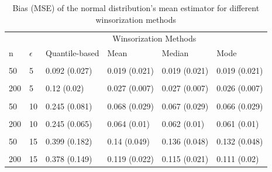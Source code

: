 \documentclass[notitlepage,12pt]{jedm}
\begin{document}
\begin{table}[H]

\caption{\label{tab:unnamed-chunk-4}Bias (MSE) of the normal distribution's mean estimator for different winsorization methods}
\centering
\begin{tabular}[t]{l|l|l|l|l|l}
\hline
\multicolumn{2}{c|}{ } & \multicolumn{4}{c}{Winsorization Methods} \\
\cline{3-6}
n & $\epsilon$ & Quantile-based & Mean & Median & Mode\\
\hline
\cellcolor{gray!6}{20} & \cellcolor{gray!6}{5} & \cellcolor{gray!6}{0.111 (0.06)} & \cellcolor{gray!6}{0.021 (0.058)} & \cellcolor{gray!6}{0.02 (0.058)} & \cellcolor{gray!6}{0.02 (0.058)}\\
\hline
50 & 5 & 0.092 (0.027) & 0.019 (0.021) & 0.019 (0.021) & 0.019 (0.021)\\
\hline
\cellcolor{gray!6}{100} & \cellcolor{gray!6}{5} & \cellcolor{gray!6}{0.122 (0.025)} & \cellcolor{gray!6}{0.029 (0.012)} & \cellcolor{gray!6}{0.029 (0.012)} & \cellcolor{gray!6}{0.028 (0.012)}\\
\hline
200 & 5 & 0.12 (0.02) & 0.027 (0.007) & 0.027 (0.007) & 0.026 (0.007)\\
\hline
\cellcolor{gray!6}{20} & \cellcolor{gray!6}{10} & \cellcolor{gray!6}{0.24 (0.111)} & \cellcolor{gray!6}{0.074 (0.068)} & \cellcolor{gray!6}{0.074 (0.068)} & \cellcolor{gray!6}{0.074 (0.069)}\\
\hline
50 & 10 & 0.245 (0.081) & 0.068 (0.029) & 0.067 (0.029) & 0.066 (0.029)\\
\hline
\cellcolor{gray!6}{100} & \cellcolor{gray!6}{10} & \cellcolor{gray!6}{0.244 (0.07)} & \cellcolor{gray!6}{0.068 (0.017)} & \cellcolor{gray!6}{0.066 (0.017)} & \cellcolor{gray!6}{0.065 (0.017)}\\
\hline
200 & 10 & 0.245 (0.065) & 0.064 (0.01) & 0.062 (0.01) & 0.061 (0.01)\\
\hline
\cellcolor{gray!6}{20} & \cellcolor{gray!6}{15} & \cellcolor{gray!6}{0.353 (0.18)} & \cellcolor{gray!6}{0.113 (0.08)} & \cellcolor{gray!6}{0.111 (0.08)} & \cellcolor{gray!6}{0.108 (0.082)}\\
\hline
50 & 15 & 0.399 (0.182) & 0.14 (0.049) & 0.136 (0.048) & 0.132 (0.048)\\
\hline
\cellcolor{gray!6}{100} & \cellcolor{gray!6}{15} & \cellcolor{gray!6}{0.378 (0.154)} & \cellcolor{gray!6}{0.121 (0.028)} & \cellcolor{gray!6}{0.117 (0.027)} & \cellcolor{gray!6}{0.113 (0.026)}\\
\hline
200 & 15 & 0.378 (0.149) & 0.119 (0.022) & 0.115 (0.021) & 0.111 (0.02)\\
\hline
\end{tabular}
\end{table}
\end{document}
